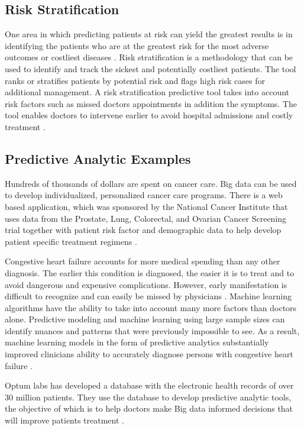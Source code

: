 \documentclass[sigconf]{acmart}
\begin{document}
\subsection{Risk Stratification}
One area in which predicting patients at risk can yield the greatest results is in identifying the patients who are at the greatest risk for the most adverse outcomes or costliest diseases \cite{springer}. Risk stratification is a methodology that can be used to identify and track the sickest and potentially costliest patients. The tool ranks or stratifies patients by potential risk and flags high risk cases for additional management. A risk stratification predictive tool takes into account risk factors such as missed doctors appointments in addition the symptoms. The tool enables doctors to intervene earlier to avoid hospital admissions and costly treatment \cite{www-google-data}.

\subsection{Predictive Analytic Examples}  
Hundreds of thousands of dollars are spent on cancer care. Big data can be used to develop individualized, personalized cancer care programs. There is a web based application, which was sponsored by the National Cancer Institute that uses data from the Prostate, Lung, Colorectal, and Ovarian Cancer Screening trial together with patient risk factor and demographic data to help develop patient specific treatment regimens \cite{www-google-CIO}. 

Congestive heart failure accounts for more medical spending than any other diagnosis. The earlier this condition is diagnosed, the easier it is to treat and to avoid dangerous and expensive complications.  However, early manifestation is difficult to recognize and can easily be missed by physicians \cite{www-google-McDonald}. Machine learning algorithms have the ability to take into account many more factors than doctors alone. Predictive modeling and machine learning using large sample sizes can identify nuances and patterns that were previously impossible to see.  As a result, machine learning models in the form of predictive analytics substantially improved clinicians ability to accurately diagnose persons with congestive heart failure \cite{www-google-datapine}. 

Optum labs has developed a database with the electronic health records of over 30 million patients. They use the database to develop predictive analytic tools, the objective of which is to help doctors make Big data informed decisions that will improve patients treatment \cite{www-google-McDonald}.  
\end{document}
